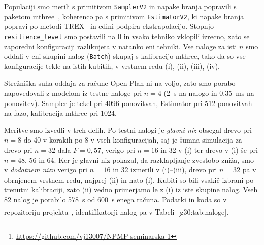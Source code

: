 Populaciji smo merili s primitivom \texttt{SamplerV2} in napake branja popravili s paketom mthree~\cite{g30:nation2021}, koherenco pa s primitivom \texttt{EstimatorV2}, ki napake branja popravi po metodi TREX~\cite{g30:vandenberg2022} in edini podpira ekstrapolacijo. Stopnjo \texttt{resilience\_\allowbreak level} smo postavili na 0 in vsako tehniko vklopili izrecno, zato se zaporedni konfiguraciji razlikujeta v natanko eni tehniki. Vse naloge za isti $n$ smo oddali v eni skupini nalog (\texttt{Batch}) skupaj s kalibracijo mthree, tako da so vse konfiguracije tekle na istih kubitih, v vrstnem redu (i), (ii), (iii), (iv).

Strežniška suha oddaja za račune Open Plan ni na voljo, zato smo porabo napovedovali z modelom iz testne naloge pri $n = 4$ (\SI{2}{\second} na nalogo in \SI{0,35}{\milli\second} na ponovitev). Sampler je tekel pri 4096 ponovitvah, Estimator pri 512 ponovitvah na fazo, kalibracija mthree pri 1024.

Meritve smo izvedli v treh delih. Po testni nalogi je \emph{glavni niz} obsegal drevo pri $n = 8$ do 40 v korakih po 8 v vseh konfiguracijah, saj je šumna simulacija za drevo pri $n = 32$ dala $F = 0{,}57$, verigo pri $n = 16$ in 32 v (i) ter drevo v (i) še pri $n = 48$, 56 in 64. Ker je glavni niz pokazal, da razklapljanje zvestobo zniža, smo v \emph{dodatnem nizu} verigo pri $n = 16$ in 32 izmerili v (i)--(iii), drevo pri $n = 32$ pa v obrnjenem vrstnem redu, najprej (ii) in nato (i). Kubiti so bili vsakič izbrani po trenutni kalibraciji, zato (ii) vedno primerjamo le z (i) iz iste skupine nalog. Vseh 82 nalog je porabilo \SI{578}{\second} od \SI{600}{\second} enega računa. Podatki in koda so v repozitoriju projekta\footnote{\url{https://github.com/vj13007/NPMP-seminarska-1}}, identifikatorji nalog pa v Tabeli~\ref{g30:tab:naloge}.


